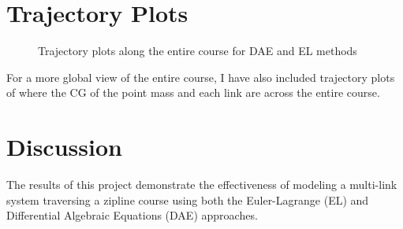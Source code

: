 \documentclass{article}
\begin{document}
\section{Trajectory Plots}
\begin{center}
	\begin{figure}[H]
		\centering
		
		\caption{Trajectory plots along the entire course for DAE and EL methods}%
		\label{fig:example5}%
	\end{figure}
\end{center}
For a more global view of the entire course, I have also included trajectory plots of where the CG of the point mass and each link are across the entire course.
\section{Discussion}
The results of this project demonstrate the effectiveness of modeling a multi-link system traversing a zipline course using both the Euler-Lagrange (EL) and Differential Algebraic Equations (DAE) approaches.
\end{document}
